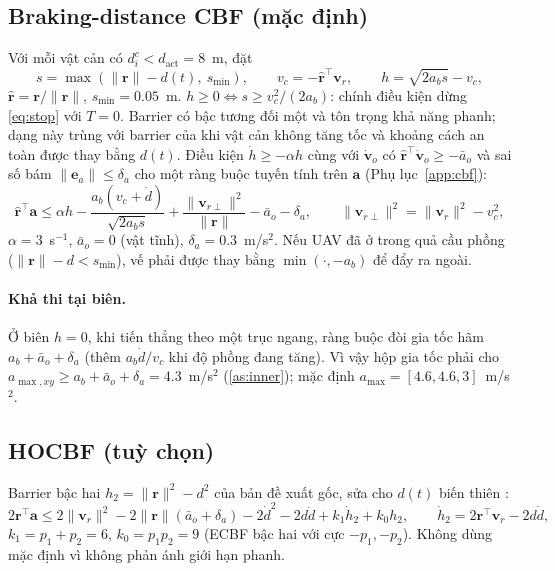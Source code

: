 \documentclass[11pt,a4paper]{article}
\numberwithin{equation}{section}
\newcommand{\vb}[1]{\bm{#1}}
\newcommand{\T}{^{\!\top}}
\theoremstyle{definition}
\theoremstyle{plain}
\theoremstyle{remark}
\begin{document}
\subsection{Braking-distance CBF (mặc định)}
\label{sec:braking}
Với mỗi vật cản có $d^c_i<d_{\text{act}}=8$~m, đặt
\begin{equation}
s=\max(\|\vb r\|-d(t),\ s_{\min}),\qquad v_c=-\hat{\vb r}\T\vb v_r,\qquad h=\sqrt{2a_bs}-v_c, \label{eq:hb}
\end{equation}
$\hat{\vb r}=\vb r/\|\vb r\|$, $s_{\min}=0.05$~m. $h\ge0\iff s\ge v_c^2/(2a_b)$: chính điều kiện dừng \eqref{eq:stop} với $T=0$. Barrier có bậc tương đối một và tôn trọng khả năng phanh; dạng này trùng với barrier của \cite{wang2017tro,wang2016hetero} khi vật cản không tăng tốc và khoảng cách an toàn được thay bằng $d(t)$. Điều kiện $\dot h\ge-\alpha h$ cùng với $\dot{\vb v}_o$ có $\hat{\vb r}\T\dot{\vb v}_o\ge-\bar a_o$ và sai số bám $\|\vb e_a\|\le\delta_a$ cho một ràng buộc tuyến tính trên $\vb a$ (Phụ lục~\ref{app:cbf}):
\begin{equation}
\hat{\vb r}\T\vb a\le\alpha h-\frac{a_b(v_c+\dot d)}{\sqrt{2a_bs}}+\frac{\|\vb v_{r\perp}\|^2}{\|\vb r\|}-\bar a_o-\delta_a,\qquad \|\vb v_{r\perp}\|^2=\|\vb v_r\|^2-v_c^2, \label{eq:cbfrow}
\end{equation}
$\alpha=3$~s$^{-1}$, $\bar a_o=0$ (vật tĩnh), $\delta_a=0.3$~m/s$^2$. Nếu UAV đã ở trong quả cầu phồng ($\|\vb r\|-d<s_{\min}$), vế phải được thay bằng $\min(\cdot,-a_b)$ để đẩy ra ngoài.

\paragraph{Khả thi tại biên.} Ở biên $h=0$, khi tiến thẳng theo một trục ngang, ràng buộc đòi gia tốc hãm $a_b+\bar a_o+\delta_a$ (thêm $a_b\dot d/v_c$ khi độ phồng đang tăng). Vì vậy hộp gia tốc phải cho $a_{\max,xy}\ge a_b+\bar a_o+\delta_a=4.3$~m/s$^2$ (\ref{as:inner}); mặc định $a_{\max}=[4.6,4.6,3]$~m/s$^2$.

\subsection{HOCBF (tuỳ chọn)}
Barrier bậc hai $h_2=\|\vb r\|^2-d^2$ của bản đề xuất gốc, sửa cho $d(t)$ biến thiên \cite{xiao2019,nguyen2016ecbf}:
\begin{equation}
2\vb r\T\vb a\le2\|\vb v_r\|^2-2\|\vb r\|(\bar a_o+\delta_a)-2\dot d^2-2d\ddot d+k_1\dot h_2+k_0h_2,\qquad \dot h_2=2\vb r\T\vb v_r-2d\dot d, \label{eq:hocbf}
\end{equation}
$k_1=p_1+p_2=6$, $k_0=p_1p_2=9$ (ECBF bậc hai với cực $-p_1,-p_2$). Không dùng mặc định vì không phản ánh giới hạn phanh.
\end{document}

